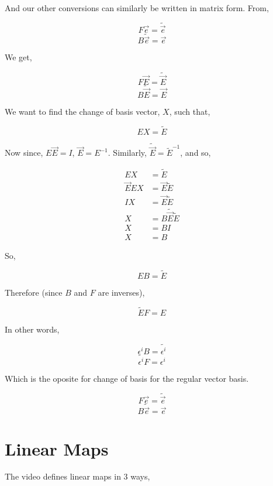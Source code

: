 \documentclass[12pt]{book}
\theoremstyle{plain}
\theoremstyle{definition}
\theoremstyle{ppart}
\theoremstyle{case}
\theoremstyle{solution}
\begin{document}
And our other conversions can similarly be written in matrix form. From,

\[ F \vec{e} = \widetilde{\vec{e}} \]
\[ B \widetilde{\vec{e}} = \vec{e} \]

We get,

\[ F \vec{E} = \widetilde{\vec{E}} \]
\[ B \widetilde{\vec{E}} = \vec{E} \]

We want to find the change of basis vector, $X$, such that,

\[ E X = \widetilde{E} \]

Now since, $E \vec{E} = I$, $\vec{E} = E^{-1}$. Similarly,
$\widetilde{\vec{E}} = \widetilde{E}^{-1}$, and so,

\begin{align*}
  E X &= \widetilde{E} \\
  \vec{E} E X &= \vec{E} \widetilde{E} \\
  I X &= \vec{E} \widetilde{E} \\
  X &= B \widetilde{\vec{E}} \widetilde{E} \\
  X &= B I \\
  X &= B
\end{align*}

So,

\[ E B = \widetilde{E} \]

Therefore (since $B$ and $F$ are inverses),

\[ \widetilde{E} F = E\]

In other words,

\label{covector_transforms}
\[ \epsilon^i B = \widetilde{\epsilon^i} \]
\[ \widetilde{\epsilon^i} F = \epsilon^i \]

Which is the oposite for change of basis for the regular vector basis.

\[ F \vec{e} = \widetilde{\vec{e}} \]
\[ B \widetilde{\vec{e}} = \vec{e} \]


\chapter{Linear Maps}

The video \cite{youtube:tensor6} defines linear maps in 3 ways,
\end{document}
